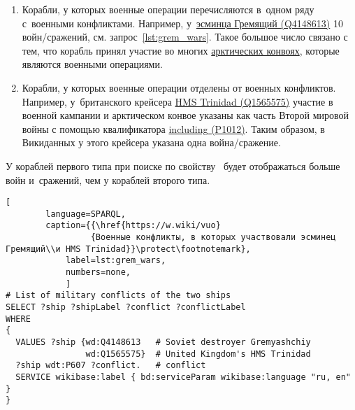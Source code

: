 \begin{enumerate}
  \item Корабли, у которых военные операции перечисляются в~одном ряду с~военными конфликтами. 
      Например, у~\href{https://www.wikidata.org/wiki/Q4148613}{эсминца Гремящий (Q4148613)} 10 войн/сражений, 
        см. запрос~\ref{lst:grem_wars}. 
        Такое большое число связано с тем, 
        что корабль принял участие во многих 
        \href{https://ru.wikipedia.org/wiki/Арктические_конвои}{арктических конвоях}, 
        которые являются военными операциями.
  \item Корабли, у которых военные операции отделены от военных конфликтов. 
      Например, у~британского крейсера 
        \href{https://www.wikidata.org/wiki/Q1565575}{HMS Trinidad (Q1565575)} 
        участие в военной кампании и арктическом конвое указаны как часть Второй мировой войны 
        с помощью квалификатора 
        \href{https://www.wikidata.org/wiki/Property:P1012}{including (P1012)}. 
        Таким образом, в Викиданных у этого крейсера указана одна война/сра\-жение.
\end{enumerate}

У кораблей первого типа при поиске по свойству~ 
будет отображаться больше войн и~сражений, чем у кораблей второго типа. 


\begin{lstlisting}[ 
        language=SPARQL, 
        caption={{\href{https://w.wiki/vuo}
                 {Военные конфликты, в которых участвовали эсминец Гремящий\\и HMS Trinidad}}\protect\footnotemark}, 
            label=lst:grem_wars, 
            numbers=none,
            ]
# List of military conflicts of the two ships 
SELECT ?ship ?shipLabel ?conflict ?conflictLabel
WHERE
{
  VALUES ?ship {wd:Q4148613   # Soviet destroyer Gremyashchiy
                wd:Q1565575}  # United Kingdom's HMS Trinidad
  ?ship wdt:P607 ?conflict.   # conflict
  SERVICE wikibase:label { bd:serviceParam wikibase:language "ru, en" }
}
\end{lstlisting}




